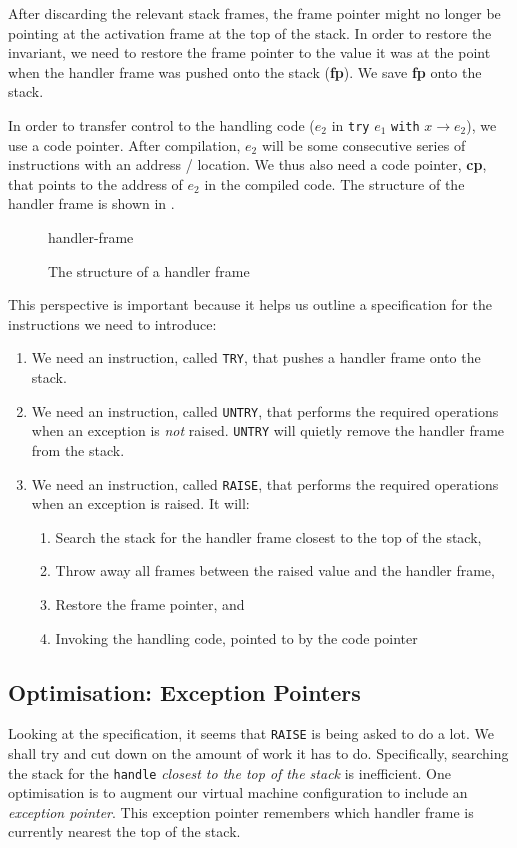 After discarding the relevant stack frames, the frame pointer might no longer be pointing at the activation frame at the top of the stack. In order to restore the invariant, we need to restore the frame pointer to the value it was at the point when the handler frame was pushed onto the stack (\textbf{fp}). We save \textbf{fp} onto the stack.

In order to transfer control to the handling code ($e_2$ in \texttt{try} $e_1$ \texttt{with} $x \to e_2$), we use a code pointer. After compilation, $e_2$ will be some consecutive series of instructions with an address / location. We thus also need a code pointer, \textbf{cp}, that points to the address of $e_2$ in the compiled code. The structure of the handler frame is shown in .

\begin{figure}[H]
    \centering
    {handler-frame}
    \caption{The structure of a handler frame}
    \label{fig:handler-frame}
\end{figure}

This perspective is important because it helps us outline a specification for the instructions we need to introduce:

\begin{enumerate}
    \item We need an instruction, called \texttt{TRY}, that pushes a handler frame onto the stack.
    \item We need an instruction, called \texttt{UNTRY}, that performs the required operations when an exception is \textit{not} raised. \texttt{UNTRY} will quietly remove the handler frame from the stack. 
    \item We need an instruction, called \texttt{RAISE}, that performs the required operations when an exception is raised. It will:
    \begin{enumerate}
        \item Search the stack for the handler frame closest to the top of the stack,
        \item Throw away all frames between the raised value and the handler frame, 
        \item Restore the frame pointer, and
        \item Invoking the handling code, pointed to by the code pointer
    \end{enumerate}
\end{enumerate}
\subsection{Optimisation: Exception Pointers}\label{section:exception-pointers}
Looking at the specification, it seems that \texttt{RAISE} is being asked to do a lot. We shall try and cut down on the amount of work it has to do. Specifically, searching the stack for the \texttt{handle} \textit{closest to the top of the stack} is inefficient. One optimisation is to augment our virtual machine configuration to include an \textit{exception pointer}. This exception pointer remembers which handler frame is currently nearest the top of the stack. 

